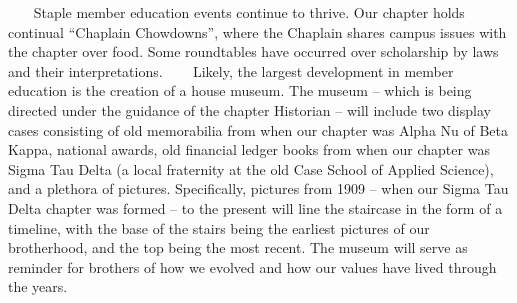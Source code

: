     
      Staple member education events continue to thrive. Our chapter holds continual ``Chaplain Chowdowns'', where the Chaplain shares campus issues with the chapter over food. Some roundtables have occurred over scholarship by laws and their interpretations.
    
      Likely, the largest development in member education is the creation of a house museum. The museum – which is being directed under the guidance of the chapter Historian – will include two display cases consisting of old memorabilia from when our chapter was Alpha Nu of Beta Kappa, national awards, old financial ledger books from when our chapter was Sigma Tau Delta (a local fraternity at the old Case School of Applied Science), and a plethora of pictures. Specifically, pictures from 1909 – when our Sigma Tau Delta chapter was formed – to the present will line the staircase in the form of a timeline, with the base of the stairs being the earliest pictures of our brotherhood, and the top being the most recent. The museum will serve as reminder for brothers of how we evolved and how our values have lived through the years. 